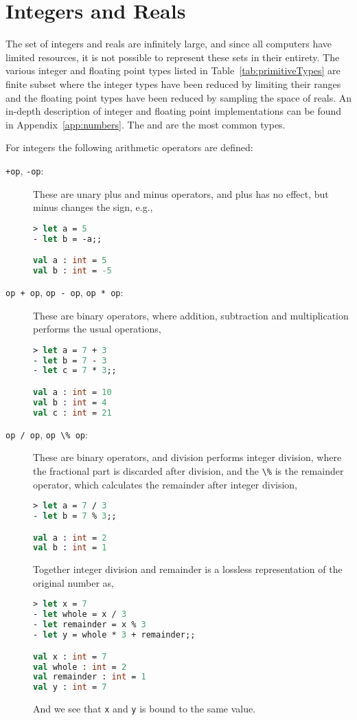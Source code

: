 \section{Integers and Reals}
The set of integers and reals are infinitely large, and since all computers have limited resources, it is not possible to represent these sets in their entirety. The various integer and floating point types listed in Table~\ref{tab:primitiveTypes} are finite subset where the integer types have been reduced by limiting their ranges and the floating point types have been reduced by sampling the space of reals. An in-depth description of integer and floating point implementations can be found in Appendix~\ref{app:numbers}. The  and  are the most common types. 

For integers the following arithmetic operators are defined: 
\begin{description}
\item[\texttt{+op}, \texttt{-op}:] These are unary plus and minus operators, and plus has no effect, but minus changes the sign, e.g.,
%
\begin{lstlisting}[language=fsharp,caption={fsharpi, unary integer negation operator.}]
> let a = 5       
- let b = -a;;

val a : int = 5
val b : int = -5
\end{lstlisting}
\item[\lstinline|op + op|, \lstinline|op - op|, \lstinline|op * op|:] These are binary operators, where addition, subtraction and multiplication performs the usual operations, 
%
\begin{lstlisting}[language=fsharp,caption={fsharpi, binary integer addition, subtraction, and multiplication operators.}]
> let a = 7 + 3
- let b = 7 - 3
- let c = 7 * 3;;

val a : int = 10
val b : int = 4
val c : int = 21
\end{lstlisting}
\item[\lstinline|op / op|, \lstinline|op \% op|:] These are binary operators, and division performs integer division, where the fractional part is discarded after division, and the \lstinline|\%| is the remainder operator, which calculates the remainder after integer division,
%
\begin{lstlisting}[language=fsharp,caption={fsharpi, binary integer division and remainder operators.}]
> let a = 7 / 3
- let b = 7 % 3;;

val a : int = 2
val b : int = 1
\end{lstlisting}
Together integer division and remainder is a lossless representation of the original number as,
%
\begin{lstlisting}[language=fsharp,caption={fsharpi, binary division and remainder is a lossless representation of an integer.}]
> let x = 7
- let whole = x / 3
- let remainder = x % 3
- let y = whole * 3 + remainder;;

val x : int = 7
val whole : int = 2
val remainder : int = 1
val y : int = 7
\end{lstlisting}
And we see that \lstinline|x| and \lstinline|y| is bound to the same value.
\end{description}
